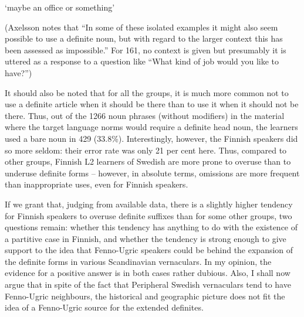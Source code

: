 \begin{styleTranslation}
‘maybe an office or something’ 

\end{styleTranslation}

\begin{styleBodyTextFirst}
(Axelsson notes that “In some of these isolated examples it might also seem possible to use a definite noun, but with regard to the larger context this has been assessed as impossible.” For 161, no context is given but presumably it is uttered as a response to a question like “What kind of job would you like to have?”)

\end{styleBodyTextFirst}

\begin{styleBodytextC}
It should also be noted that for all the groups, it is much more common not to use a definite article when it should be there than to use it when it should not be there. Thus, out of the 1266 noun phrases (without modifiers) in the material where the target language norms would require a definite head noun, the learners used a bare noun in 429 (33.8\%). Interestingly, however, the Finnish speakers did so more seldom: their error rate was only 21 per cent here. Thus, compared to other groups, Finnish L2 learners of Swedish are more prone to overuse than to underuse definite forms – however, in absolute terms, omissions are more frequent than inappropriate uses, even for Finnish speakers.  

\end{styleBodytextC}

\begin{styleBodytextC}
If we grant that, judging from available data, there is a slightly higher tendency for Finnish speakers to overuse definite suffixes than for some other groups, two questions remain: whether this tendency has anything to do with the existence of a partitive case in Finnish, and whether the tendency is strong enough to give support to the idea that Fenno-Ugric speakers could be behind the expansion of the definite forms in various Scandinavian vernaculars. In my opinion, the evidence for a positive answer is in both cases rather dubious. Also, I shall now argue that in spite of the fact that Peripheral Swedish vernaculars tend to have Fenno-Ugric neighbours, the historical and geographic picture does not fit the idea of a Fenno-Ugric source for the extended definites.

\end{styleBodytextC}

